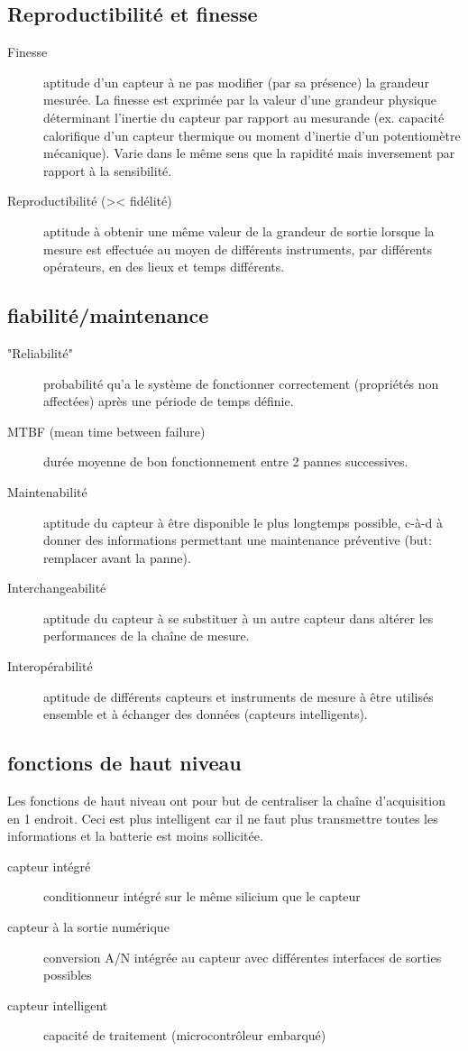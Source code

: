 \subsection{Reproductibilité et finesse}
\begin{description}
	\item[Finesse] aptitude d'un capteur à ne pas modifier (par sa présence) la grandeur mesurée. La finesse est exprimée par la valeur d'une grandeur physique déterminant l'inertie du capteur par rapport au mesurande (ex. capacité calorifique d'un capteur thermique ou moment d'inertie d'un potentiomètre mécanique). Varie dans le même sens que la rapidité mais inversement par rapport à la sensibilité.
	\item[Reproductibilité (>< fidélité)] aptitude à obtenir une même valeur de la grandeur de sortie lorsque la mesure est effectuée au moyen de différents instruments, par différents opérateurs, en des lieux et temps différents.
\end{description}
\subsection{fiabilité/maintenance}
\begin{description}
	\item["Reliabilité"] probabilité qu'a le système de fonctionner correctement (propriétés non affectées) après une période de temps définie.
	\item[MTBF (mean time between failure)] durée moyenne de bon fonctionnement entre 2 pannes successives.
	\item[Maintenabilité] aptitude du capteur à être disponible le plus longtemps possible, c-à-d à donner des informations permettant une maintenance préventive (but: remplacer avant la panne).
	\item[Interchangeabilité] aptitude du capteur à se substituer à un autre capteur dans altérer les performances de la chaîne de mesure.
	\item[Interopérabilité] aptitude de différents capteurs et instruments de mesure à être utilisés ensemble et à échanger des données (capteurs intelligents).
\end{description}
\subsection{fonctions de haut niveau}
Les fonctions de haut niveau ont pour but de centraliser la chaîne d'acquisition en 1 endroit. Ceci est plus intelligent car il ne faut plus transmettre toutes les informations et la batterie est moins sollicitée.
\begin{description}
	\item[capteur intégré] conditionneur intégré sur le même silicium que le capteur
	\item[capteur à la sortie numérique] conversion A/N intégrée au capteur avec différentes interfaces de sorties possibles
	\item[capteur intelligent] capacité de traitement (microcontrôleur embarqué)
\end{description}


